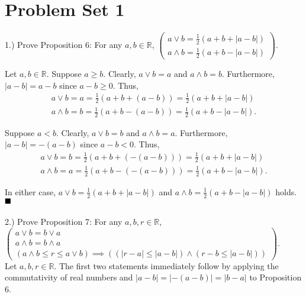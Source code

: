 \documentclass{book}
\newcommand{\pr}[1]{\left(#1\right)}
\newcommand{\setbackgroundcolour}{\pagecolor[rgb]{0.2,0.2,0.2}}
\newcommand{\settextcolour}{\color[rgb]{0.8,0.8,0.8}}
\newcommand{\invertbackgroundtext}{\setbackgroundcolour\settextcolour}
\begin{document}
\invertbackgroundtext
\setlength{\parindent}{0pt}

\section{Problem Set 1}
1.) Prove Proposition 6: For any $a, b \in \mathbb{R}$,
$\left(\begin{array}{ll}
    a \lor b = \frac{1}{2}(a + b + |a - b|)
\\  a \land b = \frac{1}{2}(a + b - |a - b|)
\end{array}\right)$.

Let $a, b \in \mathbb{R}$. Suppose $a \geq b$. Clearly, $a \lor b = a$ and $a \land b = b$. Furthermore, $|a - b| = a - b$ since $a - b \geq 0$. Thus, 
\begin{align}
    a \lor b = a = \frac{1}{2}\pr{a + b + (a - b)} = \frac{1}{2}(a + b + |a - b|)
\\  a \land b = b = \frac{1}{2}\pr{a + b - (a - b)} = \frac{1}{2}(a + b - |a - b|).
\end{align}

Suppose $a < b$. Clearly, $a \lor b = b$ and $a \land b = a$. Furthermore, $|a - b| = -(a - b)$ since $a - b < 0$. Thus, 
\begin{align}
    a \lor b = b = \frac{1}{2}\pr{a + b + \pr{-(a - b)}} = \frac{1}{2}(a + b + |a - b|)
\\  a \land b = a = \frac{1}{2}\pr{a + b - \pr{-(a - b)}} = \frac{1}{2}(a + b - |a - b|).
\end{align}

In either case, $a \lor b = \frac{1}{2}(a + b + |a - b|)$ and $a \land b = \frac{1}{2}(a + b - |a - b|)$ holds.
$\hfill \blacksquare$ \\ \\


2.) Prove Proposition 7: For any $a, b, r \in \mathbb{R}$,
$\left(\begin{array}{ll}
    a \lor b = b \lor a
\\  a \land b = b \land a
\\  (a \land b \leq r \leq a \lor b) \implies \pr{(|r - a| \leq |a - b|) \land (r - b \leq |a - b|)}
\end{array}\right)$. \\

Let $a, b, r \in \mathbb{R}$. The first two statements immediately follow by applying the commutativity of real numbers and $|a - b| = |-(a - b)| = |b - a|$ to Proposition 6. \\
\end{document}
